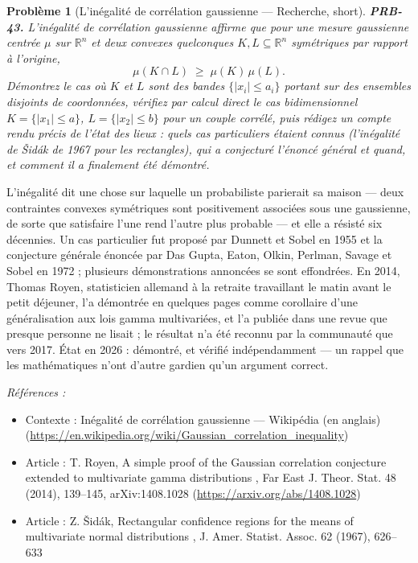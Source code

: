 \documentclass[11pt]{article}
\newtheorem{problem}{Problème}
\newenvironment{refs}{\par\small\noindent\emph{Références :}\begin{itemize}\setlength\itemsep{0pt}}{\end{itemize}\normalsize}
\begin{document}
\bigskip

\begin{problem}[{L'inégalité de corrélation gaussienne --- Recherche, short}]
\textbf{PRB-43.} L'inégalité de corrélation gaussienne affirme que pour une
mesure gaussienne centrée $ \mu $ sur $ \mathbb{R}^n $ et deux convexes quelconques
$ K, L \subseteq \mathbb{R}^n $ symétriques par rapport à l'origine,
\[ \mu(K \cap L) \;\ge\; \mu(K)\, \mu(L) . \]
Démontrez le cas où $ K $ et $ L $ sont des bandes $ \{ |x_i| \le a_i \} $ portant sur des
ensembles disjoints de coordonnées, vérifiez par calcul direct le cas bidimensionnel
$ K = \{|x_1| \le a\} $, $ L = \{|x_2| \le b\} $ pour un couple corrélé, puis rédigez un compte
rendu précis de l'état des lieux : quels cas particuliers étaient connus (l'inégalité de \v{S}idák de
1967 pour les rectangles), qui a conjecturé l'énoncé général et quand, et comment il a finalement
été démontré.
\end{problem}

\noindent L'inégalité dit une chose sur laquelle un probabiliste parierait sa maison ---
deux contraintes convexes symétriques sont positivement associées sous une gaussienne, de sorte que
satisfaire l'une rend l'autre plus probable --- et elle a résisté six décennies. Un cas particulier
fut proposé par Dunnett et Sobel en 1955 et la conjecture générale énoncée par Das Gupta, Eaton,
Olkin, Perlman, Savage et Sobel en 1972 ; plusieurs démonstrations annoncées se sont effondrées. En
2014, Thomas Royen, statisticien allemand à la retraite travaillant le matin avant le petit
déjeuner, l'a démontrée en quelques pages comme corollaire d'une généralisation aux lois gamma
multivariées, et l'a publiée dans une revue que presque personne ne lisait ; le résultat n'a été
reconnu par la communauté que vers 2017. État en 2026 : démontré, et vérifié indépendamment --- un
rappel que les mathématiques n'ont d'autre gardien qu'un argument correct.

\begin{refs}
\item Contexte : Inégalité de corrélation gaussienne --- Wikipédia (en anglais) (\url{https://en.wikipedia.org/wiki/Gaussian_correlation_inequality})
\item Article : T. Royen, \og{} A simple proof of the Gaussian correlation conjecture extended to multivariate gamma distributions \fg{}, Far East J. Theor. Stat. 48 (2014), 139--145, arXiv:1408.1028 (\url{https://arxiv.org/abs/1408.1028})
\item Article : Z. \v{S}idák, \og{} Rectangular confidence regions for the means of multivariate normal distributions \fg{}, J. Amer. Statist. Assoc. 62 (1967), 626--633
\end{refs}
\end{document}
